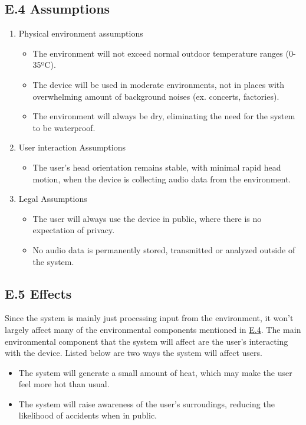 \documentclass[12pt]{article}
\theoremstyle{definition}
\begin{document}
\subsection{E.4 Assumptions} \label{item: E.4}

\begin{enumerate}
  \item Physical environment assumptions
  \begin{itemize}
    \item The environment will not exceed normal outdoor temperature ranges
    (0-35ºC). 
    \item The device will be used in moderate environments, not in places with
    overwhelming amount of background noises (ex. concerts, factories).
    \item The environment will always be dry, eliminating the need for the
    system to be waterproof. 
  \end{itemize}

  \item User interaction Assumptions
  \begin{itemize}
    \item The user's head orientation remains stable, with minimal rapid head
    motion, when the device is collecting audio data from the environment. 
  \end{itemize}

  \item Legal Assumptions
  \begin{itemize}
    \item The user will always use the device in public, where there is no
    expectation of privacy. 
    \item No audio data is permanently stored, transmitted or analyzed outside
    of the system. 
  \end{itemize}
\end{enumerate}

\subsection{E.5 Effects}

Since the system is mainly just processing input from the environment, it won't
largely affect many of the environmental components mentioned in \hyperref[item:
E.4]{E.4}. The main environmental component that the system will affect are the
user's interacting with the device. Listed below are two ways the system will
affect users.

\begin{itemize}
  \item The system will generate a small amount of heat, which may make the user
  feel more hot than usual. 
  \item The system will raise awareness of the user's surroudings, reducing the
  likelihood of accidents when in public. 
\end{itemize}
\end{document}
